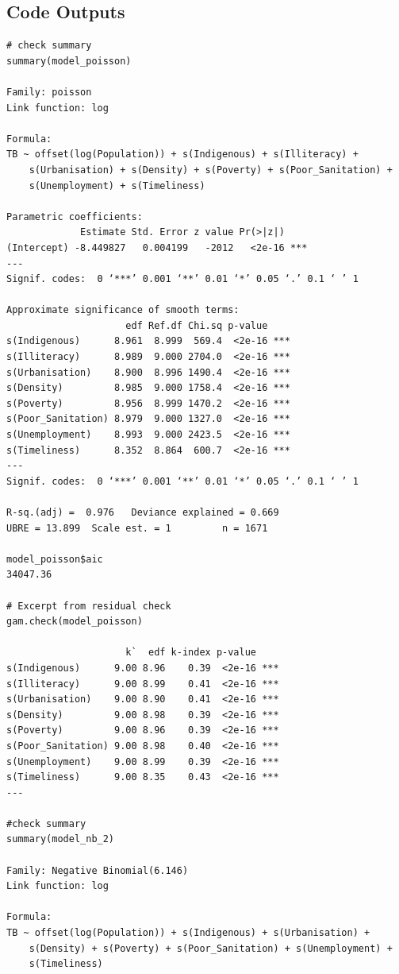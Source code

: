 \subsection{Code Outputs}
\begin{verbatim}
# check summary
summary(model_poisson)

Family: poisson 
Link function: log 

Formula:
TB ~ offset(log(Population)) + s(Indigenous) + s(Illiteracy) + 
    s(Urbanisation) + s(Density) + s(Poverty) + s(Poor_Sanitation) + 
    s(Unemployment) + s(Timeliness)

Parametric coefficients:
             Estimate Std. Error z value Pr(>|z|)    
(Intercept) -8.449827   0.004199   -2012   <2e-16 ***
---
Signif. codes:  0 ‘***’ 0.001 ‘**’ 0.01 ‘*’ 0.05 ‘.’ 0.1 ‘ ’ 1

Approximate significance of smooth terms:
                     edf Ref.df Chi.sq p-value    
s(Indigenous)      8.961  8.999  569.4  <2e-16 ***
s(Illiteracy)      8.989  9.000 2704.0  <2e-16 ***
s(Urbanisation)    8.900  8.996 1490.4  <2e-16 ***
s(Density)         8.985  9.000 1758.4  <2e-16 ***
s(Poverty)         8.956  8.999 1470.2  <2e-16 ***
s(Poor_Sanitation) 8.979  9.000 1327.0  <2e-16 ***
s(Unemployment)    8.993  9.000 2423.5  <2e-16 ***
s(Timeliness)      8.352  8.864  600.7  <2e-16 ***
---
Signif. codes:  0 ‘***’ 0.001 ‘**’ 0.01 ‘*’ 0.05 ‘.’ 0.1 ‘ ’ 1

R-sq.(adj) =  0.976   Deviance explained = 0.669
UBRE = 13.899  Scale est. = 1         n = 1671

model_poisson$aic
34047.36

# Excerpt from residual check
gam.check(model_poisson)

                     k`  edf k-index p-value    
s(Indigenous)      9.00 8.96    0.39  <2e-16 ***
s(Illiteracy)      9.00 8.99    0.41  <2e-16 ***
s(Urbanisation)    9.00 8.90    0.41  <2e-16 ***
s(Density)         9.00 8.98    0.39  <2e-16 ***
s(Poverty)         9.00 8.96    0.39  <2e-16 ***
s(Poor_Sanitation) 9.00 8.98    0.40  <2e-16 ***
s(Unemployment)    9.00 8.99    0.39  <2e-16 ***
s(Timeliness)      9.00 8.35    0.43  <2e-16 ***
---

#check summary
summary(model_nb_2)

Family: Negative Binomial(6.146) 
Link function: log 

Formula:
TB ~ offset(log(Population)) + s(Indigenous) + s(Urbanisation) + 
    s(Density) + s(Poverty) + s(Poor_Sanitation) + s(Unemployment) + 
    s(Timeliness)


\end{verbatim}
